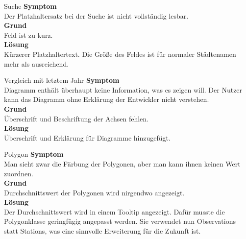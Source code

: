    \begin{Bug}{Suche}
      \textbf{Symptom}\\
      Der Platzhaltersatz bei der Suche ist nicht vollständig lesbar.\\
      \linebreak
      \textbf{Grund}\\
      Feld  ist zu kurz.\\
      \linebreak
      \textbf{Lösung}\\
      Kürzerer Platzhaltertext. Die Größe des Feldes ist für normaler Städtenamen mehr als ausreichend.\\
    \end{Bug}
      
    \begin{Bug}{Vergleich mit letztem Jahr}
      \textbf{Symptom}\\
      Diagramm enthält überhaupt keine Information, was es zeigen will. Der Nutzer kann das Diagramm ohne Erklärung der Entwickler nicht verstehen.\\
      \linebreak
      \textbf{Grund}\\
      Überschrift und Beschriftung der Achsen fehlen.\\
      \linebreak
      \textbf{Lösung}\\
      Überschrift und Erklärung für Diagramme hinzugefügt.\\
    \end{Bug}

    \begin{Bug}{Polygon}
      \textbf{Symptom}\\
      Man sieht zwar die Färbung der Polygonen, aber man kann ihnen keinen Wert zuordnen.\\
      \linebreak
      \textbf{Grund}\\
      Durchschnittswert der Polygonen wird nirgendwo angezeigt.\\
      \linebreak
      \textbf{Lösung}\\
      Der Durchschnittswert wird in einem Tooltip angezeigt. Dafür musste die Polygonklasse geringfügig
      angepasst werden. Sie verwendet nun Observations statt Stations, was eine sinnvolle Erweiterung für die Zukunft ist.\\
    \end{Bug}

